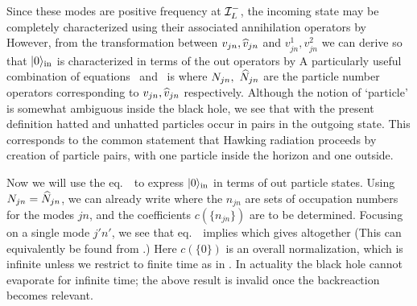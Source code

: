 Since these modes are positive frequency at ${\cal I}_L^-$, the incoming
state may be completely characterized using their associated
annihilation operators by
%
\eqn{}
%
However, from the transformation between
$v_{jn},{\widehat v}_{jn} $ and $v^{1}_{jn},v^{2}_{jn} $
we can derive
%
\eqn{}
%
so that $|0\rangle_{\rm in}$ is characterized in terms of the out operators by
%
\eqn{}
%
A particularly useful combination of equations \wone\ and \wtwo\ is
%
\eqn{}
%
where $N_{jn},\ {\widehat N}_{jn}$ are the particle number operators
corresponding to $v_{jn},{\widehat v}_{jn}$ respectively.
Although the notion of `particle' is somewhat ambiguous inside the black
hole, we see that with the present definition
hatted and unhatted particles occur in pairs in the outgoing state.
This
corresponds to the common statement that Hawking radiation proceeds by
creation of particle pairs, with one particle inside the
horizon and one outside.

Now we will use the eq.~\wthree\ to express $|0\rangle_{\rm in}$ in terms of out
particle states. Using $N_{jn}={\widehat N}_{jn}$, we can already write\Parker
%
\eqn{}
%
where the ${n_{jn}}$ are sets of occupation numbers for the modes $jn$,
and the coefficients $c\left(\{ n_{jn} \} \right)$ are to be determined.
Focusing on a single mode $j'n'$, we see that eq.~\wthree\ implies
%
\eqn{}
%
which gives altogether
%
\eqn{}
%
(This can equivalently be found from \vacreln.)
Here $c(\{0\})$ is an overall normalization, which is infinite unless we
restrict to finite time as in \norme.  In actuality the black hole cannot
evaporate for infinite time; the above result is invalid once the
backreaction becomes relevant.

